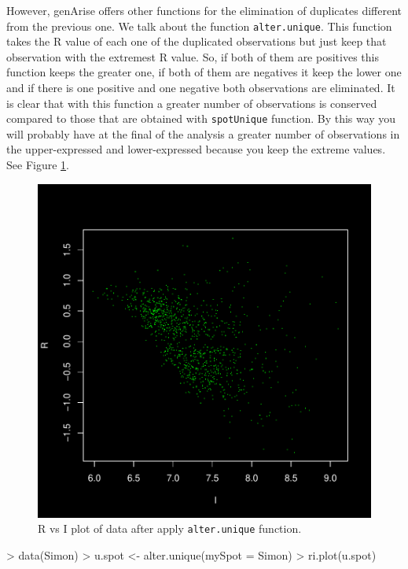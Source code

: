 \documentclass[12pt]{article}
\begin{document}
However, genArise offers other functions for the elimination of duplicates different from the previous one. We talk about the function \texttt{alter.unique}. This function takes the R value of each one of the duplicated observations but just keep that observation with the extremest R value. So, if both of them are positives this function keeps the greater one, if both of them are negatives it keep the lower one and if there is one positive and one negative both observations are eliminated. It is clear that with this function a greater number of observations is conserved compared to those that are obtained with \texttt{spotUnique} function. By this way you will probably have at the final of the analysis a greater number of observations in the upper-expressed and lower-expressed because you keep the extreme values. See Figure \ref{fig12}.\\
\begin{figure}[h]
\begin{center}
\includegraphics{example-genArise-014}
\caption{R vs I plot of data after apply \texttt{alter.unique} function.\label{fig12}}
\end{center}
\end{figure}
\begin{Scode}
> data(Simon)
> u.spot <- alter.unique(mySpot = Simon)
> ri.plot(u.spot)
\end{Scode}
\end{document}
